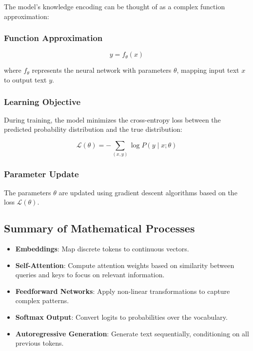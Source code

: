 \documentclass[12pt]{article}
\begin{document}
The model's knowledge encoding can be thought of as a complex function approximation:

\subsubsection{Function Approximation}

\[
y = f_\theta(x)
\]

where \( f_\theta \) represents the neural network with parameters \( \theta \), mapping input text \( x \) to output text \( y \).

\subsubsection{Learning Objective}

During training, the model minimizes the cross-entropy loss between the predicted probability distribution and the true distribution:

\[
\mathcal{L}(\theta) = -\sum_{(x, y)} \log P(y \mid x; \theta)
\]

\subsubsection{Parameter Update}

The parameters \( \theta \) are updated using gradient descent algorithms based on the loss \( \mathcal{L}(\theta) \).

\subsection{Summary of Mathematical Processes}

\begin{itemize}
    \item \textbf{Embeddings}: Map discrete tokens to continuous vectors.
    \item \textbf{Self-Attention}: Compute attention weights based on similarity between queries and keys to focus on relevant information.
    \item \textbf{Feedforward Networks}: Apply non-linear transformations to capture complex patterns.
    \item \textbf{Softmax Output}: Convert logits to probabilities over the vocabulary.
    \item \textbf{Autoregressive Generation}: Generate text sequentially, conditioning on all previous tokens.
\end{itemize}
\end{document}
